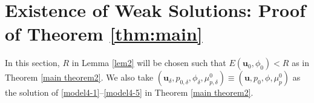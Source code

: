\documentclass[reqno,a4paper,11pt]{amsart}
\theoremstyle{plain}
\numberwithin{equation}{section}
\begin{document}
\section{Existence of Weak Solutions: Proof of Theorem \ref{thm:main}}
\label{sec:mainthm}
In this section, $R$ in Lemma \ref{lem2} will be chosen such that $E(\mathbf{u}_{0}, \phi_{0})<R$ as in Theorem \ref{main theorem2}. We also take $(\mathbf{u}_{\delta},p_{0,\delta}, \phi_{\delta},\mu_{p,\delta}^{0})\equiv (\mathbf{u},p_{0}, \phi,\mu_{p}^{0})$ as the solution of \eqref{model4-1}--\eqref{model4-5} in Theorem \ref{main theorem2}.
%
\end{document}
